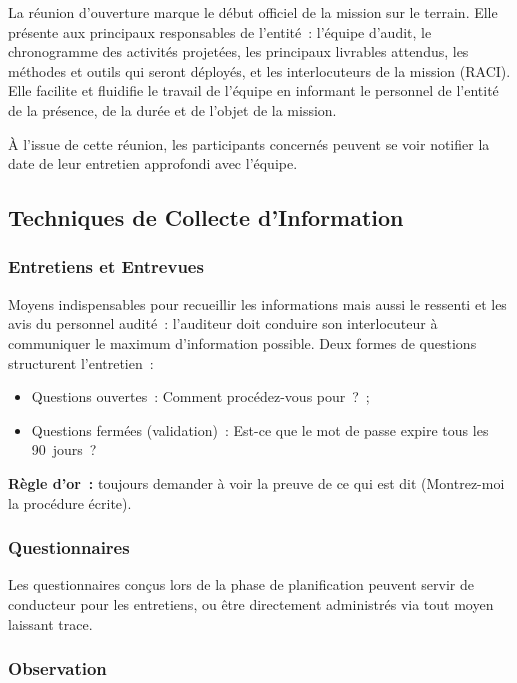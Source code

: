 La réunion d'ouverture marque le début officiel de la mission sur le terrain. Elle
présente aux principaux responsables de l'entité~: l'équipe d'audit, le chronogramme
des activités projetées, les principaux livrables attendus, les méthodes et outils
qui seront déployés, et les interlocuteurs de la mission (RACI). Elle facilite et
fluidifie le travail de l'équipe en informant le personnel de l'entité de la présence,
de la durée et de l'objet de la mission.

À l'issue de cette réunion, les participants concernés peuvent se voir notifier la
date de leur entretien approfondi avec l'équipe.

\subsection{Techniques de Collecte d'Information}
\label{subsec:collecte}

\subsubsection{Entretiens et Entrevues}

Moyens indispensables pour recueillir les informations mais aussi le ressenti
et les avis du personnel audité~: l'auditeur doit conduire son interlocuteur
à communiquer le maximum d'information possible. Deux formes de questions structurent
l'entretien~:
\begin{itemize}
    \item Questions ouvertes~: \og{}Comment procédez-vous pour~?\fg{}~;
    \item Questions fermées (validation)~: \og{}Est-ce que le mot de passe expire
        tous les 90~jours~?\fg{}
\end{itemize}
\textbf{Règle d'or~:} toujours demander à voir la preuve de ce qui est dit
(\og{}Montrez-moi la procédure écrite\fg{}).

\subsubsection{Questionnaires}

Les questionnaires conçus lors de la phase de planification peuvent servir de
conducteur pour les entretiens, ou être directement administrés via tout moyen
laissant trace.

\subsubsection{Observation}

